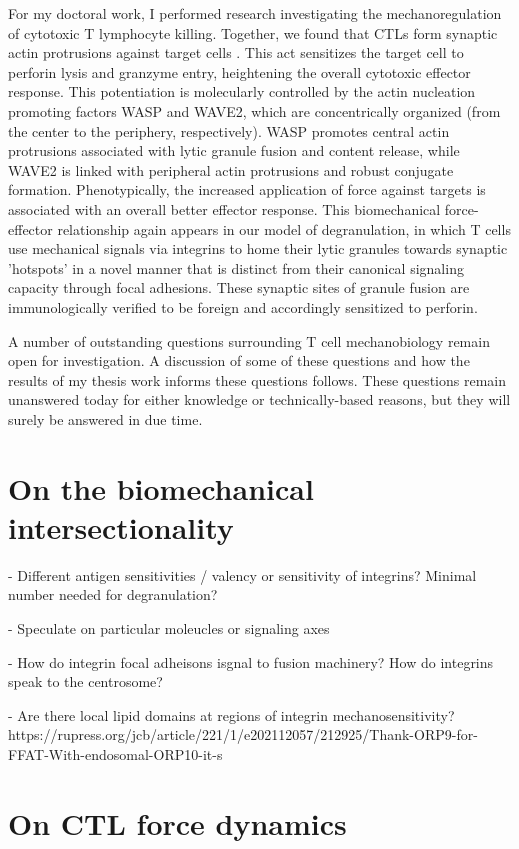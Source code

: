 For my doctoral work, I performed research investigating the mechanoregulation of cytotoxic T lymphocyte killing. Together, we found that CTLs form synaptic actin protrusions against target cells \cite{Tamzalit2018}. This act sensitizes the target cell to perforin lysis and granzyme entry, heightening the overall cytotoxic effector response. This potentiation is molecularly controlled by the actin nucleation promoting factors WASP and WAVE2, which are concentrically organized (from the center to the periphery, respectively). WASP promotes central actin protrusions associated with lytic granule fusion and content release, while WAVE2 is linked with peripheral actin protrusions and robust conjugate formation. Phenotypically, the increased application of force against targets is associated with an overall better effector response. This biomechanical force-effector relationship again appears in our model of degranulation, in which T cells use mechanical signals via integrins to home their lytic granules towards synaptic 'hotspots' in a novel manner that is distinct from their canonical signaling capacity through focal adhesions. These synaptic sites of granule fusion are immunologically verified to be foreign and accordingly sensitized to perforin. 

A number of outstanding questions surrounding T cell mechanobiology remain open for investigation. A discussion of some of these questions and how the results of my thesis work informs these questions follows. These questions remain unanswered today for either knowledge or technically-based reasons, but they will surely be answered in due time.

\section{On the biomechanical intersectionality}

- Different antigen sensitivities / valency or sensitivity of integrins? Minimal number needed for degranulation?

- Speculate on particular moleucles or signaling axes

- How do integrin focal adheisons isgnal to fusion machinery? How do integrins speak to the centrosome?

- Are there local lipid domains at regions of integrin mechanosensitivity? https://rupress.org/jcb/article/221/1/e202112057/212925/Thank-ORP9-for-FFAT-With-endosomal-ORP10-it-s

\section{On CTL force dynamics}

